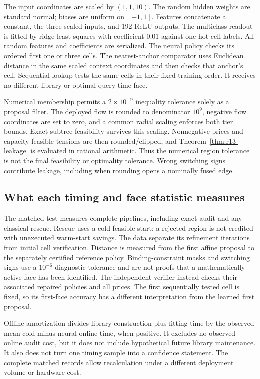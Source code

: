 \documentclass[11pt,letterpaper]{article}
\theoremstyle{definition}
\newcommand{\1}{\mathbf 1}
\begin{document}
The input coordinates are scaled by $(1,1,10)$. The random hidden weights are standard normal; biases are uniform on $[-1,1]$. Features concatenate a constant, the three scaled inputs, and 192 ReLU outputs. The multiclass readout is fitted by ridge least squares with coefficient $0.01$ against one-hot cell labels. All random features and coefficients are serialized. The neural policy checks its ordered first one or three cells. The nearest-anchor comparator uses Euclidean distance in the same scaled context coordinates and then checks that anchor's cell. Sequential lookup tests the same cells in their fixed training order. It receives no different library or optimal query-time face.

Numerical membership permits a $2\times10^{-9}$ inequality tolerance solely as a proposal filter. The deployed flow is rounded to denominator $10^9$, negative flow coordinates are set to zero, and a common radial scaling enforces both tier bounds. Exact subtree feasibility survives this scaling. Nonnegative prices and capacity-feasible tensions are then rounded/clipped, and Theorem~\ref{thm:r13-leakage} is evaluated in rational arithmetic. Thus the numerical region tolerance is not the final feasibility or optimality tolerance. Wrong switching signs contribute leakage, including when rounding opens a nominally fused edge.

\subsection{What each timing and face statistic measures}
The matched test measures complete pipelines, including exact audit and any classical rescue. Rescue uses a cold feasible start; a rejected region is not credited with unexecuted warm-start savings. The data separate its refinement iterations from initial cell verification. Distance is measured from the first affine proposal to the separately certified reference policy. Binding-constraint masks and switching signs use a $10^{-6}$ diagnostic tolerance and are not proofs that a mathematically active face has been identified. The independent verifier instead checks their associated repaired policies and all prices. The first sequentially tested cell is fixed, so its first-face accuracy has a different interpretation from the learned first proposal.

Offline amortization divides library-construction plus fitting time by the observed mean cold-minus-neural online time, when positive. It excludes no observed online audit cost, but it does not include hypothetical future library maintenance. It also does not turn one timing sample into a confidence statement. The complete matched records allow recalculation under a different deployment volume or hardware cost.
\end{document}
